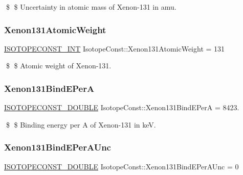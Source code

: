 \$ \$ Uncertainty in atomic mass of Xenon-\/131 in amu. \mbox{\label{group___isotope_const-_xenon-_xe131_ga7c87b081a0873344229a7f282918abc2}} 
\subsubsection{\texorpdfstring{Xenon131\+Atomic\+Weight}{Xenon131AtomicWeight}}
{\footnotesize\ttfamily \mbox{\hyperlink{group___isotope_const-_macros_ga5f18360b3e99483a35c32d789e62621c}{I\+S\+O\+T\+O\+P\+E\+C\+O\+N\+S\+T\+\_\+\+I\+NT}} Isotope\+Const\+::\+Xenon131\+Atomic\+Weight = 131}

\$ \$ Atomic weight of Xenon-\/131. \mbox{\label{group___isotope_const-_xenon-_xe131_ga94a73aaee63664cb78c257fc0ee620ef}} 
\subsubsection{\texorpdfstring{Xenon131\+Bind\+E\+PerA}{Xenon131BindEPerA}}
{\footnotesize\ttfamily \mbox{\hyperlink{group___isotope_const-_macros_ga8f45a7272ce02c0b4c65c44636ed719a}{I\+S\+O\+T\+O\+P\+E\+C\+O\+N\+S\+T\+\_\+\+D\+O\+U\+B\+LE}} Isotope\+Const\+::\+Xenon131\+Bind\+E\+PerA = 8423.}

\$ \$ Binding energy per A of Xenon-\/131 in keV. \mbox{\label{group___isotope_const-_xenon-_xe131_ga142d69211b15e6e0a54c03d240b399cf}} 
\subsubsection{\texorpdfstring{Xenon131\+Bind\+E\+Per\+A\+Unc}{Xenon131BindEPerAUnc}}
{\footnotesize\ttfamily \mbox{\hyperlink{group___isotope_const-_macros_ga8f45a7272ce02c0b4c65c44636ed719a}{I\+S\+O\+T\+O\+P\+E\+C\+O\+N\+S\+T\+\_\+\+D\+O\+U\+B\+LE}} Isotope\+Const\+::\+Xenon131\+Bind\+E\+Per\+A\+Unc = 0}

